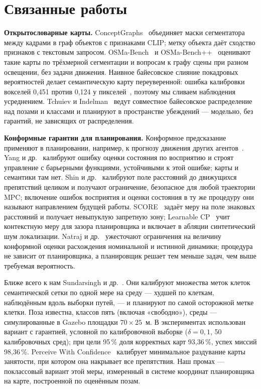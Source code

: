 \section{Связанные работы}

\textbf{Открытословарные карты.} ConceptGraphs~\cite{conceptgraphs} объединяет маски сегментатора между кадрами в граф объектов с признаками CLIP; метку объекта даёт сходство признаков с текстовым запросом. OSMa-Bench~\cite{osmabench} и OSMa-Bench++~\cite{osmabenchpp} оценивают такие карты по трёхмерной сегментации и вопросам к графу сцены при разном освещении, без задачи движения. Наивное байесовское слияние покадровых вероятностей делает семантическую карту переуверенной: ошибка калибровки вокселей 0,451 против 0,124 у пикселей~\cite{overconf}, поэтому мы сливаем наблюдения усреднением. Tchuiev и Indelman~\cite{tchuiev} ведут совместное байесовское распределение над позами и классами и планируют в пространстве убеждений --- модельно, без гарантий, не зависящих от распределения.

\textbf{Конформные гарантии для планирования.} Конформное предсказание применяют в планировании, например, к прогнозу движения других агентов~\cite{lindemann}. Yang и др.~\cite{yang2023} калибруют ошибку оценки состояния по восприятию и строят управление с барьерными функциями, устойчивыми к этой ошибке; карты и семантики там нет. Shin и др.~\cite{shin2026} калибруют поле расстояний до движущихся препятствий целиком и получают ограничение, безопасное для любой траектории MPC; включение ошибок восприятия и оценки состояния в ту же процедуру они называют направлением будущей работы. SCORE~\cite{score} задаёт меру на поле знаковых расстояний и получает невыпуклую запретную зону; Learnable CP~\cite{learnablecp} учит контекстную меру для зазора планировщика и включает в абляции синтетический шум локализации. Natraj и др.~\cite{tightening} ужесточают ограничения на величину конформной оценки расхождения номинальной и истинной динамики; процедура не зависит от планировщика, а планировщик решает тем меньше задач, чем выше требуемая вероятность.

Ближе всего к нам Sundarsingh и др.~\cite{sundarsingh}. Они калибруют множества меток клеток семантической сетки по одной мере на среду --- худшей по клеткам, наблюдённым вдоль выборки путей, --- и планируют по самой осторожной метке клетки. Поза известна, классов пять (включая «свободно»), среды --- симулированные в Gazebo площадки $70\times25$~м. В экспериментах использован вариант с гарантией, условной по калибровочной выборке ($\delta = 0{,}1$, 50 калибровочных сред); при цели 95\,\% доля корректных карт 93,36\,\%, успех миссий 98,36\,\%. Perceive With Confidence~\cite{pwc} калибрует минимальное раздувание карты занятости, при котором она накрывает все препятствия. Наш промах --- поклассовый вариант этой меры, измеренный в системе координат планировщика на карте, построенной по оценённым позам.

